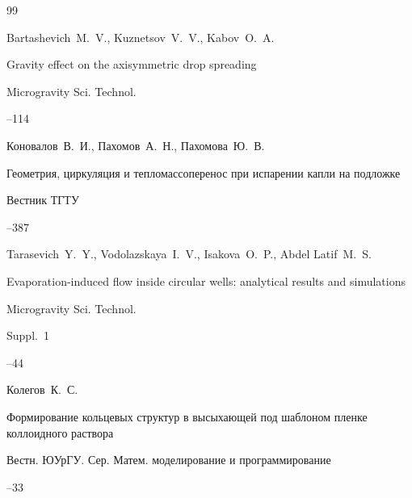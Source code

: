 \begin{thebibliography}{99}

\by Bartashevich~M.~V., Kuznetsov~V.~V., Kabov~O.~A.

\paper Gravity effect on the axisymmetric drop spreading 

\jour Microgravity Sci. Technol.




--114





\by Коновалов~В.~И., Пахомов~А.~Н., Пахомова~Ю.~В.

\paper  Геометрия, циркуляция и тепломассоперенос при испарении капли на подложке 

\jour Вестник ТГТУ




--387




\by Tarasevich~Y.~Y., Vodolazskaya~I.~V., Isakova~O.~P., Abdel Latif~M.~S. 

\paper Evaporation-induced flow inside circular wells: analytical results and simulations 

\jour Microgravity Sci. Technol.



\issueinfo Suppl.~1

--44





\by Колегов~К.~С.

\paper  Формирование кольцевых структур в высыхающей под шаблоном пленке коллоидного раствора 

\jour Вестн. ЮУрГУ. Сер. Матем. моделирование и программирование




--33



\end{thebibliography}

